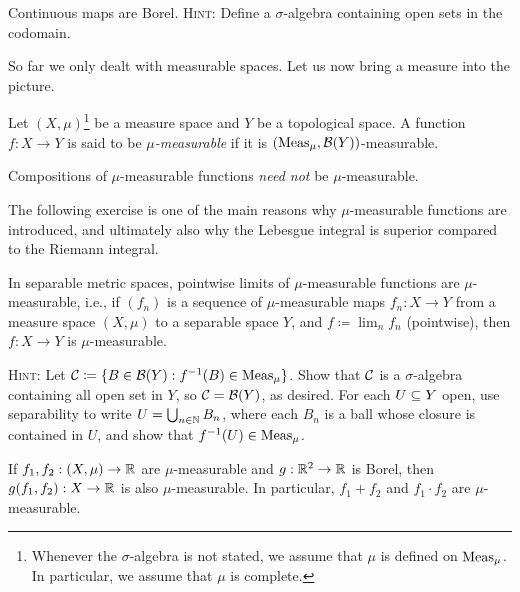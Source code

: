 \documentclass[reqno, twoside]{article}
\begin{document}
    \begin{exercise}
        Continuous maps are Borel. \textsc{Hint:} Define a $\sigma$-algebra containing open sets in the codomain.
    \end{exercise}

    So far we only dealt with measurable spaces. Let us now bring a measure into the picture.

    \begin{definition}
        Let $(X,\mu)$\footnote{Whenever the $\sigma$-algebra is not stated, we assume that $\mu$ is defined on $\operatorname{Meas}_\mu$. In particular, we assume that $\mu$ is complete.} be a measure space and $Y$ be a topological space. A function $f:X\to Y$ is said to be \textit{$\mu$-measurable} if it is $(\operatorname{Meas}_\mu,\mathcal{B}(Y))$-measurable.
    \end{definition}

    \begin{remark}
        Compositions of $\mu$-measurable functions \textit{need not} be $\mu$-measurable.
    \end{remark}

    The following exercise is one of the main reasons why $\mu$-measurable functions are introduced, and ultimately also why the Lebesgue integral is superior compared to the Riemann integral.

    \begin{exercise}
        In separable metric spaces, pointwise limits of $\mu$-measurable functions are $\mu$-measurable, i.e., if $(f_n)$ is a sequence of $\mu$-measurable maps $f_n:X\to Y$ from a measure space $(X,\mu)$ to a separable space $Y$, and $f\coloneqq\lim_nf_n$ (pointwise), then $f:X\to Y$ is $\mu$-measurable.

        \textsc{Hint:} Let $\mathcal{C}\coloneqq\{B\in\mathcal{B}(Y): f^{-1}(B)\in\operatorname{Meas}_\mu\}$. Show that $\mathcal{C}$ is a $\sigma$-algebra containing all open set in $Y$, so $\mathcal{C}=\mathcal{B}(Y)$, as desired. For each $U\subseteq Y$ open, use separability to write $U=\bigcup_{n\in\mathbb{N}}B_n$, where each $B_n$ is a ball whose closure is contained in $U$, and show that $f^{-1}(U)\in\operatorname{Meas}_\mu$.
    \end{exercise}

    \begin{exercise}
        If $f_1,f_2:(X,\mu)\to\mathbb{R}$ are $\mu$-measurable and $g:\mathbb{R}^2\to\mathbb{R}$ is Borel, then $g(f_1,f_2):X\to\mathbb{R}$ is also $\mu$-measurable. In particular, $f_1+f_2$ and $f_1\cdot f_2$ are $\mu$-measurable.
    \end{exercise}
\end{document}
